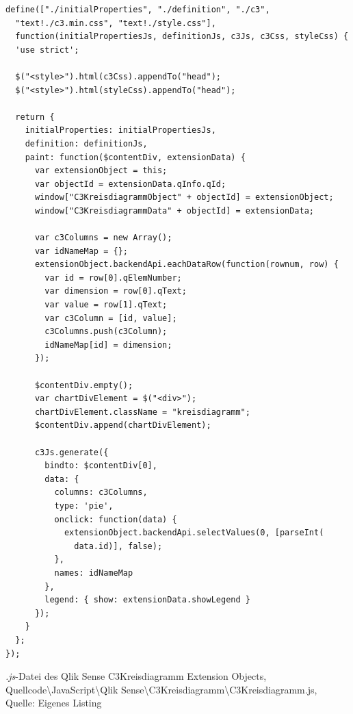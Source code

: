 \begin{listing}[htbp]
\begin{verbatim}
define(["./initialProperties", "./definition", "./c3",
  "text!./c3.min.css", "text!./style.css"], 
  function(initialPropertiesJs, definitionJs, c3Js, c3Css, styleCss) {
  'use strict';

  $("<style>").html(c3Css).appendTo("head");
  $("<style>").html(styleCss).appendTo("head");

  return {
    initialProperties: initialPropertiesJs,
    definition: definitionJs,
    paint: function($contentDiv, extensionData) {
      var extensionObject = this;
      var objectId = extensionData.qInfo.qId;
      window["C3KreisdiagrammObject" + objectId] = extensionObject;
      window["C3KreisdiagrammData" + objectId] = extensionData;

      var c3Columns = new Array();
      var idNameMap = {};
      extensionObject.backendApi.eachDataRow(function(rownum, row) {
        var id = row[0].qElemNumber;
        var dimension = row[0].qText;
        var value = row[1].qText;
        var c3Column = [id, value];
        c3Columns.push(c3Column);
        idNameMap[id] = dimension;
      });

      $contentDiv.empty();
      var chartDivElement = $("<div>");
      chartDivElement.className = "kreisdiagramm";
      $contentDiv.append(chartDivElement);

      c3Js.generate({
        bindto: $contentDiv[0],
        data: {
          columns: c3Columns,
          type: 'pie',
          onclick: function(data) {
            extensionObject.backendApi.selectValues(0, [parseInt(
              data.id)], false);
          },
          names: idNameMap
        },
        legend: { show: extensionData.showLegend }
      });
    }
  };
});
\end{verbatim}
\caption[\textit{.js}-Datei des Qlik Sense C3Kreisdiagramm Extension Objects ]{\textit{.js}-Datei des Qlik Sense C3Kreisdiagramm Extension Objects, \\Quellcode\textbackslash{}JavaScript\textbackslash{}Qlik Sense\textbackslash{}C3Kreisdiagramm\textbackslash{}C3Kreisdiagramm.js, \\Quelle: Eigenes Listing}
\label{lst:QlikSenseC3KreisdiagrammC3KreisdiagrammJs}
\end{listing}


